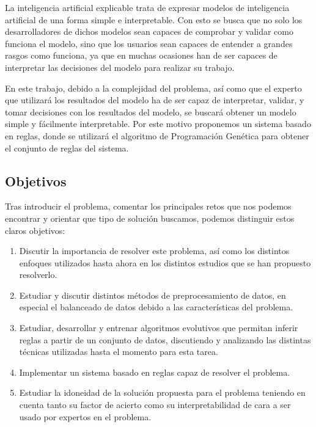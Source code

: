 La inteligencia artificial explicable trata de expresar modelos de inteligencia artificial de una forma simple e interpretable. Con esto se busca que no solo los desarrolladores de dichos modelos sean capaces de comprobar y validar como funciona el modelo, sino que los usuarios sean capaces de entender a grandes rasgos como funciona, ya que en muchas ocasiones han de ser capaces de interpretar las decisiones del modelo para realizar su trabajo.

En este trabajo, debido a la complejidad del problema, así como que el experto que utilizará los resultados del modelo ha de ser capaz de interpretar, validar, y tomar decisiones con los resultados del modelo, se buscará obtener un modelo simple y fácilmente interpretable. Por este motivo proponemos un sistema basado en reglas, donde se utilizará el algoritmo de Programación Genética para obtener el conjunto de reglas del sistema.

\newpage

\subsection{Objetivos}

Tras introducir el problema, comentar los principales retos que nos podemos encontrar y orientar que tipo de solución buscamos, podemos distinguir estos claros objetivos:

\begin{enumerate}
	\item Discutir la importancia de resolver este problema, así como los distintos enfoques utilizados hasta ahora en los distintos estudios que se han propuesto resolverlo.
	\item Estudiar y discutir distintos métodos de preprocesamiento de datos, en especial el balanceado de datos debido a las características del problema.
	\item Estudiar, desarrollar y entrenar algoritmos evolutivos que permitan inferir reglas a partir de un conjunto de datos, discutiendo y analizando las distintas técnicas utilizadas hasta el momento para esta tarea.
	\item Implementar un sistema basado en reglas capaz de resolver el problema.
	\item Estudiar la idoneidad de la solución propuesta para el problema teniendo en cuenta tanto su factor de acierto como su interpretabilidad de cara a ser usado por expertos en el problema.
\end{enumerate}


\newpage
